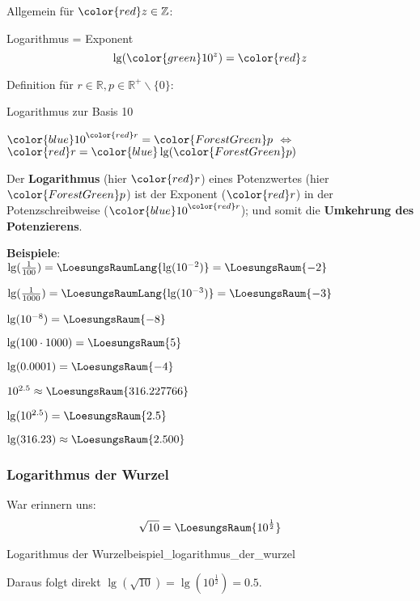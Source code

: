 \vspace{5mm}

Allgemein für ${\color{red}z}\in \mathbb{Z}$:

\begin{definition}{Logarithmus = Exponent}{}
  $$\lg({\color{green} 10^z}) = {\color{red} z}$$
\end{definition}


Definition für $r\in\mathbb{R}, p \in \mathbb{R}^{+}\backslash\{0\}$:
\begin{definition}{Logarithmus zur Basis 10}{}
  \begin{center}
    ${\color{blue}10}^{\color{red}r}={\color{ForestGreen}p}$
    $\Longleftrightarrow$
    ${\color{red}r} = {\color{blue}\lg}({\color{ForestGreen}p})$
    \end{center}
\end{definition}

\begin{bemerkung}{}{}
  Der \textbf{Logarithmus} (hier $\color{red}r$) eines Potenzwertes
  (hier $\color{ForestGreen}p$) ist der Exponent ($\color{red}r$) in der
  Potenzschreibweise (${\color{blue}10}^{\color{red}r}$); und somit die \textbf{Umkehrung des Potenzierens}.
\end{bemerkung}

\textbf{Beispiele}:\\

$\lg(\frac1{100}) =\LoesungsRaumLang{\lg(10^{-2}) } = \LoesungsRaum{-2}$
\leserluft{}

$\lg(\frac1{1000}) =\LoesungsRaumLang{\lg(10^{-3}) } = \LoesungsRaum{-3}$
\leserluft{}

$\lg(10^{-8}) = \LoesungsRaum{-8}$
\leserluft{}

$\lg(100 \cdot{} 1000) = \LoesungsRaum{5}$
\leserluft{}

$\lg(0.0001) = \LoesungsRaum{-4}$
\leserluft{}

$10^{2.5} \approx \LoesungsRaum{316.227766}$
\leserluft{}

$\lg(10^{2.5}) = \LoesungsRaum{2.5}$

\leserluft{}

$\lg(316.23) \approx \LoesungsRaum{2.500}$


\newpage
\subsubsection{Logarithmus der Wurzel}
War erinnern uns: $$\sqrt{10} =\LoesungsRaum{ 10^\frac12}$$
\begin{beispiel}{Logarithmus der
    Wurzel}{beispiel_logarithmus_der_wurzel}

  Daraus folgt direkt $\lg(\sqrt{10}) =\lg(10^\frac12)  = 0.5$.
\end{beispiel}

